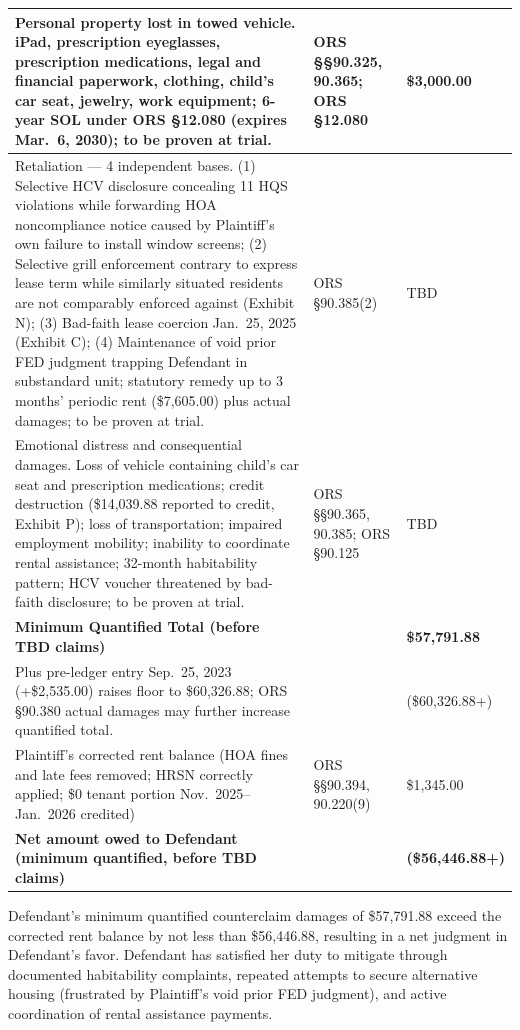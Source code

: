 \documentclass[12pt,letterpaper]{article}
\begin{document}
\begin{singlespace}
\begin{longtable}{|p{2.8in}|p{1.4in}|p{1.0in}|}
			\hline
			Personal property lost in towed vehicle. iPad, prescription eyeglasses, prescription medications, legal and financial paperwork, clothing, child's car seat, jewelry, work equipment; 6-year SOL under ORS \S12.080 (expires Mar.\ 6, 2030); to be proven at trial. & ORS \S\S90.325, 90.365; ORS \S12.080 & \$3,000.00 \\
			\hline
			Retaliation --- 4 independent bases. (1) Selective HCV disclosure concealing 11 HQS violations while forwarding HOA noncompliance notice caused by Plaintiff's own failure to install window screens; (2) Selective grill enforcement contrary to express lease term while similarly situated residents are not comparably enforced against (Exhibit N); (3) Bad-faith lease coercion Jan.\ 25, 2025 (Exhibit C); (4) Maintenance of void prior FED judgment trapping Defendant in substandard unit; statutory remedy up to 3 months' periodic rent (\$7,605.00) plus actual damages; to be proven at trial. & ORS \S90.385(2) & TBD \\
			\hline
			Emotional distress and consequential damages. Loss of vehicle containing child's car seat and prescription medications; credit destruction (\$14,039.88 reported to credit, Exhibit P); loss of transportation; impaired employment mobility; inability to coordinate rental assistance; 32-month habitability pattern; HCV voucher threatened by bad-faith disclosure; to be proven at trial. & ORS \S\S90.365, 90.385; ORS \S90.125 & TBD \\
			\hline
			\textbf{Minimum Quantified Total (before TBD claims)} & & \textbf{\$57,791.88} \\
			\hline
			Plus pre-ledger entry Sep.\ 25, 2023 (+\$2,535.00) raises floor to \$60,326.88; ORS \S90.380 actual damages may further increase quantified total. & & (\$60,326.88+) \\
			\hline
			Plaintiff's corrected rent balance (HOA fines and late fees removed; HRSN correctly applied; \$0 tenant portion Nov.\ 2025--Jan.\ 2026 credited) & ORS \S\S90.394, 90.220(9) & \$1,345.00 \\
			\hline
			\textbf{Net amount owed to Defendant (minimum quantified, before TBD claims)} & & \textbf{(\$56,446.88+)} \\
			\hline
		\end{longtable}
	\end{singlespace}
	
	Defendant's minimum quantified counterclaim damages of \$57,791.88 exceed the corrected rent balance by not less than \$56,446.88, resulting in a net judgment in Defendant's favor. Defendant has satisfied her duty to mitigate through documented habitability complaints, repeated attempts to secure alternative housing (frustrated by Plaintiff's void prior FED judgment), and active coordination of rental assistance payments.
	
\end{document}
